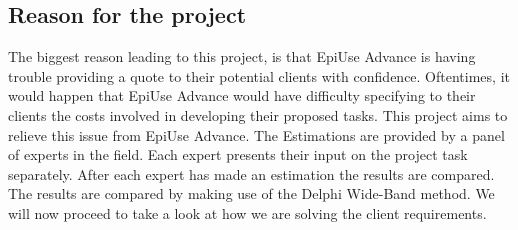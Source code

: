 \subsection{Reason for the project}
The biggest reason leading to this project, is that EpiUse Advance is having trouble providing a quote to their potential clients with confidence. Oftentimes, it would happen that EpiUse Advance would have difficulty specifying to their clients the costs involved in developing their proposed tasks. This project aims to relieve this issue from EpiUse Advance.
\newline
The Estimations are provided by a panel of experts in the field. Each expert presents their input on the project task separately. After each expert has made an estimation the results are compared. The results are compared by making use of the Delphi Wide-Band method. We will now proceed to take a look at how we are solving the client requirements.
